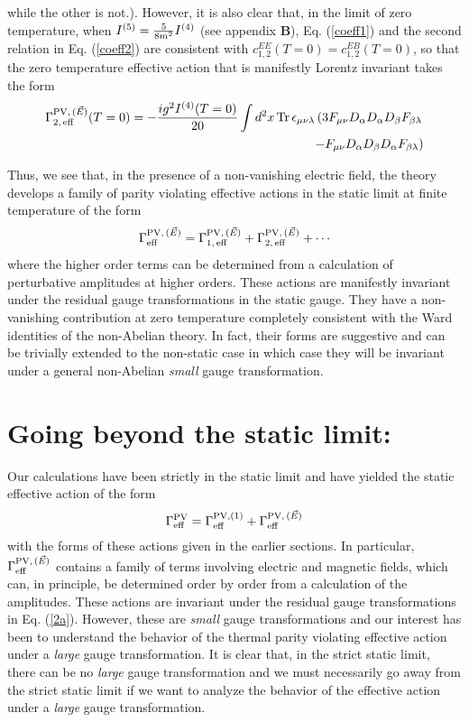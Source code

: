 \documentclass[a4paper,12pt]{article}
\begin{document}
while the other is not.). However, it is also clear that,
in the limit of zero temperature, when $I^{(5)}={5\over 8 m^2}I^{(4)}$
(see appendix {\bf B}),
Eq. (\ref{coeff1}) and the second relation in Eq. (\ref{coeff2}) are
consistent with $c_{1,2}^{EE}(T=0)= c_{1,2}^{EB}(T=0)$, so that the
zero temperature effective action that is manifestly Lorentz invariant
takes the form
\begin{eqnarray}
\Gamma_{2,\,{\rm eff}}^{{\rm PV},\,(\vec{E})}(T=0) = -{ig^2
  I^{(4)}(T=0)\over 20} 
  \int d^{2}x\,{\rm
  Tr}\,\epsilon_{\mu\nu\lambda}\left(3F_{\mu\nu}D_{\alpha}D_{\alpha}
D_{\beta}F_{ \beta\lambda} \right.\nonumber\\ \left.- 
  F_{\mu\nu}D_{\alpha}D_{\beta}D_{\alpha}F_{\beta\lambda}\right)\label{29}
\end{eqnarray}

Thus, we see that, in the presence of a non-vanishing electric field,
the theory develops a family of parity violating effective actions in
the static limit at finite temperature of the form
\begin{equation}
\Gamma_{\rm eff}^{{\rm PV},\,(\vec{E})} = \Gamma_{1,\,{\rm eff}}^{{\rm
    PV},\,(\vec{E})} + \Gamma_{2,\,{\rm eff}}^{{\rm PV},\,(\vec{E})} +
    \cdots\label{30}
\end{equation}
where the higher order terms can be determined from a calculation of
perturbative amplitudes at higher orders. These actions are manifestly
invariant under the residual gauge transformations in the static
gauge. They have a non-vanishing contribution at zero temperature
completely consistent with the Ward identities of the non-Abelian
theory. In fact, their forms are suggestive and can be trivially
extended to the non-static case in which case they will be invariant
under a general non-Abelian {\it small} gauge transformation.

\section{Going beyond the static limit:}

Our calculations have been strictly in the static limit and have
yielded the static effective action of the form
\begin{equation}
\Gamma_{\rm eff}^{\rm PV} = \Gamma_{\rm eff}^{{\rm PV}, (1)}
+ \Gamma_{\rm eff}^{{\rm PV},\,(\vec{E})}
\end{equation}
with the forms of these actions given in the earlier sections. In
particular, $\Gamma_{\rm eff}^{{\rm PV},\,(\vec{E})}$ contains a family
of terms involving electric and magnetic fields, which can, in
principle, be determined order by order from a calculation of the
amplitudes. These actions are invariant under the residual gauge
transformations in Eq. (\ref{2a}). However, these are {\it small}
gauge transformations and our interest has been to understand the
behavior of the thermal parity violating effective action under a {\it large}
gauge transformation. It is clear that, in the strict static limit,
there can be no {\it large} gauge transformation and we must
necessarily go away from the strict static limit if we want to analyze
the behavior of the effective action under a {\it large} gauge
transformation.
\end{document}
